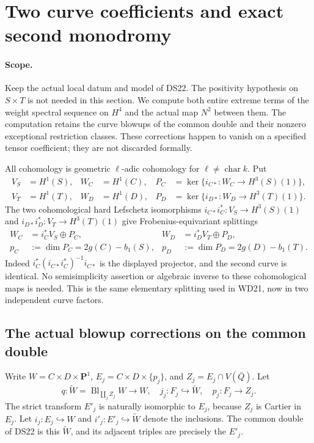 \section{Two curve coefficients and exact second monodromy}
\label{r22dw:section}

\paragraph{Scope.}
Keep the actual local datum and model of DS22.  The positivity
hypothesis on $S\times T$ is not needed in this section.  We compute
both entire extreme terms of the weight spectral sequence on $H^4$
and the actual map $N^2$ between them.  The computation retains the
curve blowups of the common double and their nonzero exceptional
restriction classes.  These corrections happen to vanish on a
specified tensor coefficient; they are not discarded formally.

All cohomology is geometric $\ell$-adic cohomology for
$\ell\ne\operatorname{char}k$.  Put
\[
\begin{aligned}
 V_S&=H^1(S),&W_C&=H^1(C),&
 P_C&=\ker\{i_{C*}:W_C\longrightarrow H^3(S)(1)\},\\
 V_T&=H^1(T),&W_D&=H^1(D),&
 P_D&=\ker\{i_{D*}:W_D\longrightarrow H^3(T)(1)\}.
\end{aligned}
 \tag{DW22.1}\label{r22dw:coefficients}
\]
The two cohomological hard Lefschetz isomorphisms
$i_{C*}i_C^*:V_S\to H^3(S)(1)$ and
$i_{D*}i_D^*:V_T\to H^3(T)(1)$ give Frobenius-equivariant splittings
\[
 \begin{aligned}
 W_C&=i_C^*V_S\oplus P_C,&
 W_D&=i_D^*V_T\oplus P_D,\\
 p_C&:=\dim P_C=2g(C)-b_1(S),&
 p_D&:=\dim P_D=2g(D)-b_1(T).
 \end{aligned}
 \tag{DW22.2}\label{r22dw:split}
\]
Indeed $i_C^*(i_{C*}i_C^*)^{-1}i_{C*}$ is the displayed projector,
and the second curve is identical.  No semisimplicity assertion or
algebraic inverse to these cohomological maps is needed.  This is
the same elementary splitting used in WD21, now in two independent
curve factors.

\subsection{The actual blowup corrections on the common double}

Write $W=C\times D\times\mathbf P^1$,
$E_j=C\times D\times\{p_j\}$, and
$Z_j=E_j\cap V(\bar Q)$.  Let
\[
 q:\widetilde W=\operatorname{Bl}_{\coprod_j Z_j}W\longrightarrow W,
 \quad j_j:F_j\hookrightarrow\widetilde W,
 \quad p_j:F_j\longrightarrow Z_j.
 \tag{DW22.3}\label{r22dw:blowup}
\]
The strict transform $E'_j$ is naturally isomorphic to $E_j$,
because $Z_j$ is Cartier in $E_j$.  Let $i_j:E_j\hookrightarrow W$
and $i'_j:E'_j\hookrightarrow\widetilde W$ denote the inclusions.
The common double of DS22 is this $\widetilde W$, and its adjacent
triples are precisely the $E'_j$.

